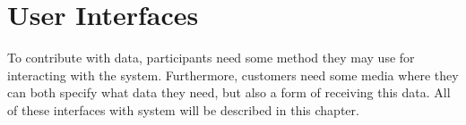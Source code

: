 
\chapter{User Interfaces}
\label{cha:user_interfaces}

To contribute with data, participants need some method they may use for interacting with the system. Furthermore, customers need some media where they can both specify what data they need, but also a form of receiving this data. All of these interfaces with system will be described in this chapter.



